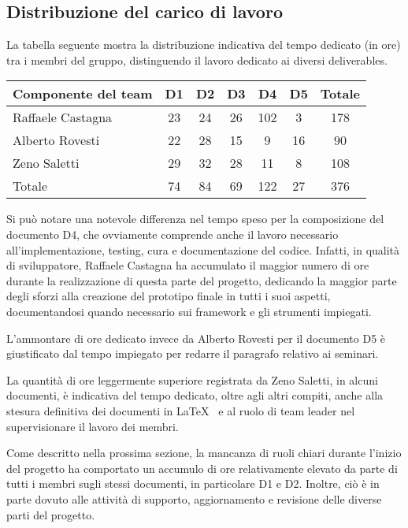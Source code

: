 \documentclass[11pt, a4paper]{article}
\theoremstyle{definition}
\begin{document}
\subsection{Distribuzione del carico di lavoro}
La tabella seguente mostra la distribuzione indicativa del tempo dedicato
(in ore) tra i membri del gruppo, distinguendo il lavoro dedicato ai diversi
deliverables.
\begin{center}
  \footnotesize
  \begin{tabularx}{\textwidth}{|X||c||c||c||c||c||c|}
      \hline
      \cellcolor{red!70}Componente del team & \cellcolor{red!70}D1 & \cellcolor{red!70}D2 & \cellcolor{red!70}D3 & \cellcolor{red!70}D4 & \cellcolor{red!70}D5 & \cellcolor{red!70}Totale\\
      \hline
      Raffaele Castagna        &23&24&26&102&3&178\\
      \hline
      Alberto Rovesti          &22&28&15&9&16&90\\
      \hline
      Zeno Saletti             &29&32&28&11&8&108\\
      \hline
      \cellcolor{red!70}Totale &74&84&69&122&27&376\\
      \hline
  \end{tabularx}
\end{center}

Si può notare una notevole differenza nel tempo speso per la composizione
del documento D4, che ovviamente comprende anche il lavoro necessario all'implementazione,
testing, cura e documentazione del codice. Infatti, in qualità di sviluppatore,
Raffaele Castagna ha accumulato il maggior numero di ore durante la realizzazione
di questa parte del progetto, dedicando la maggior parte degli sforzi alla
creazione del prototipo finale in tutti i suoi aspetti, documentandosi quando
necessario sui framework e gli strumenti impiegati.

L'ammontare di ore dedicato invece da Alberto Rovesti per il documento D5 è
giustificato dal tempo impiegato per redarre il paragrafo relativo ai seminari.

La quantità di ore leggermente superiore registrata da Zeno Saletti, in alcuni
documenti, è indicativa del tempo dedicato, oltre agli altri compiti, anche alla stesura definitiva
dei documenti in \LaTeX \texttt{ } e al ruolo di team leader nel supervisionare il lavoro
dei membri.

Come descritto nella prossima sezione, la mancanza di
ruoli chiari durante l'inizio del progetto ha comportato un accumulo
di ore relativamente elevato da parte di tutti i membri sugli stessi documenti, in
particolare D1 e D2. Inoltre, ciò è in parte dovuto alle attività di supporto,
aggiornamento e revisione delle diverse parti del progetto.
\end{document}
